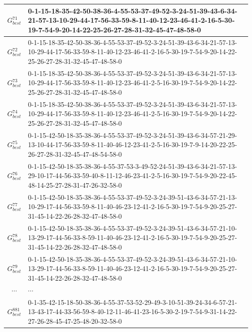 \begin{landscape}
{\begin{tabularx}{\linewidth}{|c|X|}
        $G_{best}^{71}$  & 0-1-15-18-35-42-50-38-36-4-55-53-37-49-52-3-24-51-39-43-6-34-21-57-13-10-29-44-17-56-33-59-8-11-40-12-23-46-41-2-16-5-30-19-7-54-9-20-14-22-25-26-27-28-31-32-45-47-48-58-0 \\ \hline
        $G_{best}^{72}$  & 0-1-15-18-35-42-50-38-36-4-55-53-37-49-52-3-24-51-39-43-6-34-21-57-13-10-29-44-17-56-33-59-8-11-40-12-23-46-41-2-16-5-30-19-7-54-9-20-14-22-25-26-27-28-31-32-45-47-48-58-0 \\ \hline
        $G_{best}^{73}$  & 0-1-15-18-35-42-50-38-36-4-55-53-37-49-52-3-24-51-39-43-6-34-21-57-13-10-29-44-17-56-33-59-8-11-40-12-23-46-41-2-5-16-30-19-7-54-9-20-14-22-25-26-27-28-31-32-45-47-48-58-0 \\ \hline
        $G_{best}^{74}$  & 0-1-15-18-35-42-50-38-36-4-55-53-37-49-52-3-24-51-39-43-6-34-21-57-13-10-29-44-17-56-33-59-8-11-40-12-23-46-41-2-5-16-30-19-7-54-9-20-14-22-25-26-27-28-31-32-45-47-48-58-0 \\ \hline
        $G_{best}^{75}$  & 0-1-15-42-50-18-35-38-36-4-55-53-37-49-52-3-24-51-39-43-6-34-57-21-29-13-10-44-17-56-33-59-8-11-40-46-12-23-41-2-5-16-30-19-7-9-14-20-22-25-26-27-28-31-32-45-47-48-54-58-0 \\ \hline
        $G_{best}^{76}$  & 0-1-15-42-50-18-35-38-36-4-55-37-53-3-49-52-24-51-39-43-6-34-21-57-13-29-10-17-44-56-33-59-40-8-11-12-46-23-41-2-5-16-30-19-7-54-9-20-22-45-48-14-25-27-28-31-47-26-32-58-0 \\ \hline
        $G_{best}^{77}$  & 0-1-15-42-50-18-35-38-36-4-55-53-37-49-52-3-24-39-51-43-6-34-57-21-13-10-29-17-44-56-33-59-8-11-40-46-23-12-41-2-16-5-30-19-7-54-9-20-25-27-31-45-14-22-26-28-32-47-48-58-0 \\ \hline
        $G_{best}^{78}$  & 0-1-15-42-50-18-35-38-36-4-55-53-37-49-52-3-24-39-51-43-6-34-57-21-10-13-29-17-44-56-33-8-59-11-40-46-23-12-41-2-16-5-30-19-7-54-9-20-25-27-31-45-14-22-26-28-32-47-48-58-0 \\ \hline
        $G_{best}^{79}$  & 0-1-15-42-50-18-35-38-36-4-55-53-37-49-52-3-24-39-51-43-6-34-57-21-10-13-29-17-44-56-33-8-59-11-40-46-23-12-41-2-16-5-30-19-7-54-9-20-25-27-31-45-14-22-26-28-32-47-48-58-0 \\ \hline
        $\cdots$         & $\cdots$                                                                                                                                                                    \\ \hline
        $G_{best}^{881}$ & 0-1-35-42-15-18-50-38-36-4-55-37-53-52-29-49-3-10-51-39-24-34-6-57-21-13-43-17-44-33-56-59-8-40-12-11-46-41-23-16-5-30-2-19-7-54-9-31-14-22-27-26-28-45-47-25-48-20-32-58-0 \\ \hline

\end{tabularx}}
\end{landscape}
